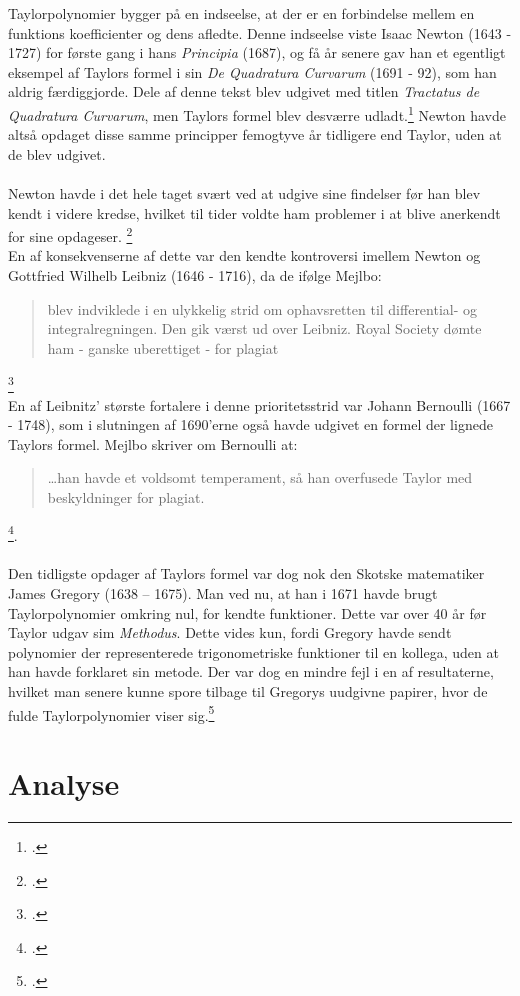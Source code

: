 \documentclass[12pt, a4paper]{article}
\begin{document}
\begin{refsection}
Taylorpolynomier bygger på en indseelse, at der er en forbindelse mellem en funktions koefficienter og dens afledte. Denne indseelse viste Isaac Newton (1643 - 1727) for første gang i hans \textit{Principia} (1687), og få år senere gav han et egentligt eksempel af Taylors formel i sin \textit{De Quadratura Curvarum} (1691 - 92), som han aldrig færdiggjorde. Dele af denne tekst blev udgivet med titlen \textit{Tractatus de Quadratura Curvarum}, men Taylors formel blev desværre udladt.\footcite[s. 248]{roy_2021} Newton havde altså opdaget disse samme principper femogtyve år tidligere end Taylor, uden at de blev udgivet.\\
\\
Newton havde i det hele taget svært ved at udgive sine findelser før han blev kendt i videre kredse, hvilket til tider voldte ham problemer i at blive anerkendt for sine opdageser. \footcite[s. 116]{uendeligerækker}\\
En af konsekvenserne af dette var den kendte kontroversi imellem Newton og Gottfried Wilhelb Leibniz (1646 - 1716), da de ifølge Mejlbo:
\blockquote{blev indviklede i en ulykkelig strid om ophavsretten til differential- og integralregningen. Den gik værst  ud over Leibniz. Royal Society dømte ham - ganske uberettiget - for plagiat}.\footcite[s. 103]{uendeligerækker}\\
En af Leibnitz' største fortalere i denne prioritetsstrid var Johann Bernoulli (1667 - 1748), som i slutningen af 1690'erne også havde udgivet en formel der lignede Taylors formel. Mejlbo skriver om Bernoulli at: \blockquote{\dots han havde et voldsomt temperament, så han overfusede Taylor med beskyldninger for plagiat.}\footcite[s. 111]{uendeligerækker}.\\
\\
Den tidligste opdager af Taylors formel var dog nok den Skotske matematiker James Gregory (1638 – 1675). Man ved nu, at han i 1671 havde brugt Taylorpolynomier omkring nul, for kendte funktioner. Dette var over 40 år før Taylor udgav sim \textit{Methodus}. Dette vides kun, fordi Gregory havde sendt polynomier der representerede trigonometriske funktioner til en kollega, uden at han havde forklaret sin metode. Der var dog en mindre fejl i en af resultaterne, hvilket man senere kunne spore tilbage til Gregorys uudgivne papirer, hvor de fulde Taylorpolynomier viser sig.\footcite[s. 113-118]{alma99122953280205763}
\section{Analyse} %

\end{refsection}
\end{document}
